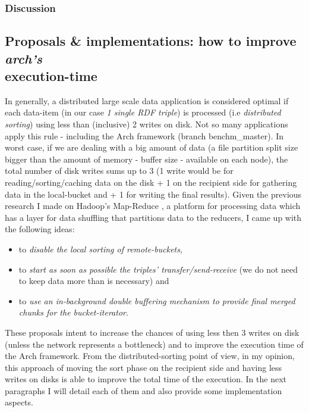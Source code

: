 % 
\subsubsection*{Discussion}

% 
\subsection{Proposals \& implementations: how to improve \textit{arch's} \\ execution-time}

In generally, a distributed large scale data application is considered optimal if each data-item (in our case \textit{1 single RDF triple}) is processed (i.e \textit{distributed sorting}) using less than (inclusive) 2 writes on disk. Not so many applications apply this rule - including the Arch framework (branch benchm\_master). In worst case, if we are dealing with a big amount of data (a file partition split size bigger than the amount of memory - buffer size - available on each node), the total number of disk writes sums up to 3 (1 write would be for reading/sorting/caching data on the disk + 1 on the recipient side for gathering data in the local-bucket and + 1 for writing the final results). Given the previous research I made on Hadoop's Map-Reduce \cite{hadoop}, a platform for processing data which has a layer for data shuffling \cite{shuffling} that partitions data to the reducers, I came up with the following ideas: 
\begin{itemize}
\item to \textit{disable the local sorting of remote-buckets},
\item to \textit{start as soon as possible the triples' transfer/send-receive} (we do not need to keep data more than is necessary) and
\item to \textit{use an in-background double buffering mechanism to provide final merged chunks for the bucket-iterator}. 
\end{itemize}
  
These proposals intent to increase the chances of using less then 3 writes on disk (unless the network represents a bottleneck) and to improve the execution time of the Arch framework. From the distributed-sorting point of view, in my opinion, this approach of moving the sort phase on the recipient side and having less writes on disks is able to improve the total time of the execution. In the next paragraphs I will detail each of them and also provide some implementation aspects.

